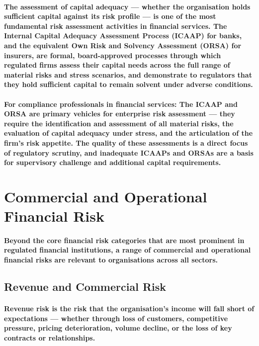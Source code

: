 \paragraph{The assessment of capital adequacy — whether the organisation holds sufficient capital against its risk profile — is one of the most fundamental risk assessment activities in financial services. The \textbf{Internal Capital Adequacy Assessment Process (ICAAP)} for banks, and the equivalent \textbf{Own Risk and Solvency Assessment (ORSA)} for insurers, are formal, board-approved processes through which regulated firms assess their capital needs across the full range of material risks and stress scenarios, and demonstrate to regulators that they hold sufficient capital to remain solvent under adverse conditions.}
\paragraph{\textbf{For compliance professionals in financial services}: The ICAAP and ORSA are primary vehicles for enterprise risk assessment — they require the identification and assessment of all material risks, the evaluation of capital adequacy under stress, and the articulation of the firm's risk appetite. The quality of these assessments is a direct focus of regulatory scrutiny, and inadequate ICAAPs and ORSAs are a basis for supervisory challenge and additional capital requirements.}

\section{Commercial and Operational Financial Risk}
\paragraph{Beyond the core financial risk categories that are most prominent in regulated financial institutions, a range of commercial and operational financial risks are relevant to organisations across all sectors.}

\subsection{Revenue and Commercial Risk}
\paragraph{\textbf{Revenue risk} is the risk that the organisation's income will fall short of expectations — whether through loss of customers, competitive pressure, pricing deterioration, volume decline, or the loss of key contracts or relationships.}

